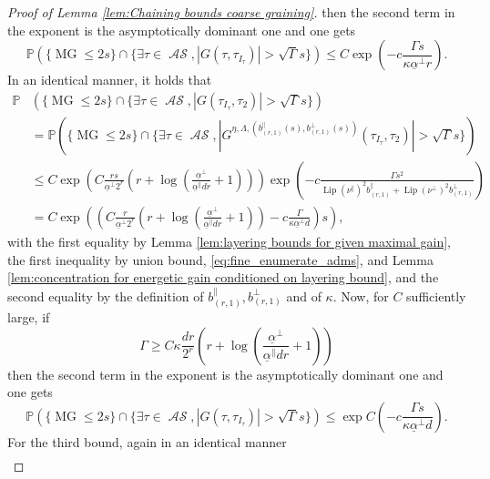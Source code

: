 \documentclass[11pt, reqno]{amsart}
\DeclareMathOperator{\lip}{Lip}
\DeclareMathOperator{\MG}{MG}
\DeclareMathOperator{\AS}{\mathcal{AS}}
\renewcommand{\P}{\mathbb{P}}
\numberwithin{equation}{section}
\begin{document}
\begin{proof}[Proof of Lemma \ref{lem:Chaining bounds coarse graining}]
then the second term in the exponent is the asymptotically dominant one and one gets
\begin{equation*}
\P\left( \{\MG\leq 2s \} \cap \{\exists \tau \in \AS, |G(\tau,\tau_{I_{\tau}})|>\sqrt{\Gamma} s \} \right)\leq C\exp \left(-c\frac{\Gamma s}{ \kappa \underline{\alpha}^{\perp} r} \right).
\end{equation*}
In an identical manner, it holds that 
\begin{align*}
\P&\left( \{\MG\leq 2s \} \cap \{\exists \tau \in \AS, |G(\tau_{I_{\tau}}, \tau_{2})|>\sqrt{\Gamma} s \} \right)\\
&=\P \left( \{\MG\leq 2s \} \cap \{\exists \tau \in \AS, |G^{\eta, \Lambda, (b^{\parallel}_{(r,1)}(s),b^{\perp}_{(r,1)}(s))}(\tau_{I_{\tau}},\tau_{2})|>\sqrt{\Gamma} s \} \right) \\
&\leq C\exp \left(C \frac{r s}{ \underline{\alpha}^{\perp} 2^{r}} \left(r+\log\left(\frac{\underline{\alpha}^{\perp}}{ \underline{\alpha}^{\parallel}dr}+1 \right) \right)\right) 
\exp \left(-c\frac{\Gamma s^2}{\lip(\nu^{\parallel})^{2} b^{\parallel}_{(r,1)}+\lip(\nu^{\perp})^{2} b^{\perp}_{(r,1)} } \right) \\
&= C\exp \left( \left( C \frac{r }{ \underline{\alpha}^{\perp} 2^{r}} \left(r+\log\left(\frac{\underline{\alpha}^{\perp}}{ \underline{\alpha}^{\parallel}dr}+1 \right)\right) - c\frac{\Gamma }{ \kappa \underline{\alpha}^{\perp}  d}\right)s \right),
\end{align*}
with the first equality by Lemma \ref{lem:layering bounds for given maximal gain}, the first inequality by union bound, \eqref{eq:fine_enumerate_adms}, and Lemma \ref{lem:concentration for energetic gain conditioned on layering bound},
and the second equality by the definition of $b^{\parallel}_{(r,1)},b^{\perp}_{(r,1)}$ and of $\kappa$.
Now, for $C$ sufficiently large, if 
\begin{equation*}
\Gamma  \geq  C \kappa \frac{d r}{ 2^{r}} \left(r+\log\left(\frac{\underline{\alpha}^{\perp}}{ \underline{\alpha}^{\parallel}dr}+1 \right)\right) 
\end{equation*}
then the second term in the exponent is the asymptotically dominant one and one gets
\begin{equation*}
\P\left( \{\MG\leq 2s \} \cap \{\exists \tau \in \AS, |G(\tau,\tau_{I_{\tau}})|>\sqrt{\Gamma} s \} \right)\leq \exp C\left(-c\frac{\Gamma s }{\kappa \underline{\alpha}^{\perp} d } \right).
\end{equation*}
For the third bound, again in an identical manner 
\begin{align*}

\end{align*}
\end{proof}
\end{document}
